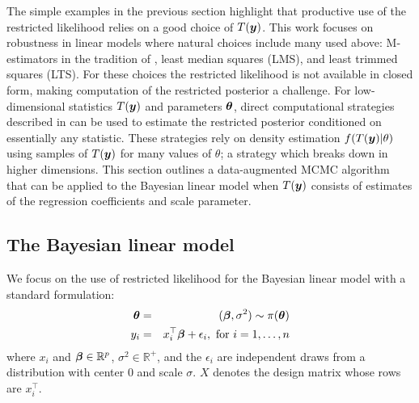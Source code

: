 \documentclass[12pt]{article}
\def\bth{\mbox{\boldmath $\theta$}}
\def\bbeta{\mbox{\boldmath $\beta$}}
\newcommand{\by}{\mbox{\boldmath $y$}}
\begin{document}
The simple examples in the previous section highlight that productive use of the restricted likelihood relies on a good choice of $T(\by)$. This work focuses on robustness in linear models where natural choices include many used above:  M-estimators in the tradition of \cite{huber1964}, least median squares (LMS), and least trimmed squares (LTS). For these choices the restricted likelihood is not available in closed form, making computation of the restricted posterior a challenge. For low-dimensional statistics $T(\by)$ and parameters $\bth$, direct computational strategies described in \cite{lewis2014} can be used to estimate the restricted posterior conditioned on essentially any statistic.  These strategies rely on density estimation $f(T(\by)|\theta)$ using samples of $T(\by)$ for many values of $\theta$; a strategy which breaks down in higher dimensions. This section outlines a data-augmented MCMC algorithm that can be applied to the Bayesian linear model when $T(\by)$ consists of estimates of the regression coefficients and scale parameter. 

\subsection{The Bayesian linear model}
We focus on the use of restricted likelihood for the Bayesian linear
model with a standard formulation: 
\begin{eqnarray}
\label{LinearModel}
\bth&=&(\bbeta,\sigma^2) \sim  \pi(\bth) 
\nonumber\\
y_i  & =  & x_i^\top \bbeta + \epsilon_i , \mbox{ for } i = 1, \ldots, n 
\end{eqnarray}
where $x_i$ and $\bbeta \in \mathbb{R}^p$, $\sigma^2 \in \mathbb{R}^+$, 
and the $\epsilon_i$ are independent draws from a distribution with center $0$ and scale $\sigma$. $X$ denotes the design matrix whose rows are  $x_i^\top$. 
\end{document}
